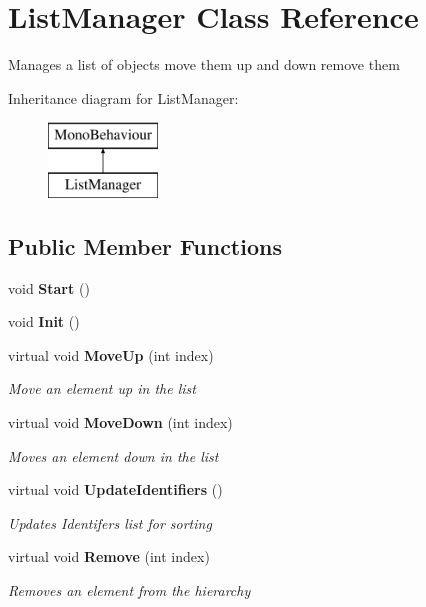 \section{List\+Manager Class Reference}
\label{class_list_manager}


Manages a list of objects move them up and down remove them  


Inheritance diagram for List\+Manager\+:\begin{figure}[H]
\begin{center}
\leavevmode
\includegraphics[height=2.000000cm]{class_list_manager}
\end{center}
\end{figure}
\subsection*{Public Member Functions}
\begin{DoxyCompactItemize}
\item 
void \textbf{ Start} ()
\item 
void \textbf{ Init} ()
\item 
virtual void \textbf{ Move\+Up} (int index)
\begin{DoxyCompactList}\small\item\em Move an element up in the list \end{DoxyCompactList}\item 
virtual void \textbf{ Move\+Down} (int index)
\begin{DoxyCompactList}\small\item\em Moves an element down in the list \end{DoxyCompactList}\item 
virtual void \textbf{ Update\+Identifiers} ()
\begin{DoxyCompactList}\small\item\em Updates Identifers list for sorting \end{DoxyCompactList}\item 
virtual void \textbf{ Remove} (int index)
\begin{DoxyCompactList}\small\item\em Removes an element from the hierarchy \end{DoxyCompactList}\end{DoxyCompactItemize}
